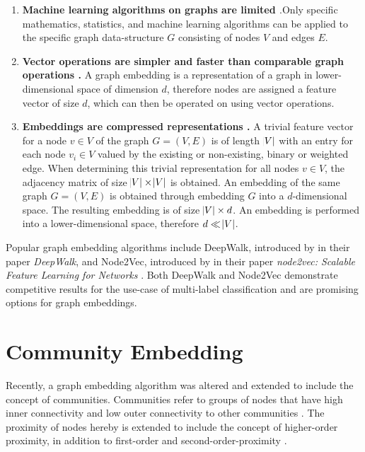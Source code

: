 \documentclass[conference]{IEEEtran}
\begin{document}
\begin{enumerate}
    \item \textbf{Machine learning algorithms on graphs are limited \cite{Godec2018}}.Only specific mathematics, statistics, and machine learning algorithms can be applied to the specific graph data-structure $G$ consisting of nodes $V$ and edges $E$.
    \item \textbf{Vector operations are simpler and faster than comparable graph operations \cite{Godec2018}.} A graph embedding is a representation of a graph in lower-dimensional space of dimension $d$, therefore nodes are assigned a feature vector of size $d$, which can then be operated on using vector operations.
    \item \textbf{Embeddings are compressed representations \cite{Godec2018}.} A trivial feature vector for a node $v \in V$ of the graph $G = (V, E)$ is of length $\abs{V}$ with an entry for each node $v_i \in V$ valued by the existing or non-existing, binary or weighted edge. When determining this trivial representation for all nodes $v \in V$, the adjacency matrix of size $\abs{V} \times \abs{V}$ is obtained. An embedding of the same graph $G = (V, E)$ is obtained through embedding $G$ into a $d$-dimensional space. The resulting embedding is of size $\abs{V} \times d$. An embedding is performed into a lower-dimensional space, therefore $d \ll \abs{V}$.
\end{enumerate}

Popular graph embedding algorithms include DeepWalk, introduced by \citeauthor{Perozzi2014DeepWalkOL} in their \citeyear{Perozzi2014DeepWalkOL} paper \textit{DeepWalk}, and Node2Vec, introduced by \citeauthor{Grover2016node2vecSF} in their \citeyear{Grover2016node2vecSF} paper \textit{node2vec: Scalable Feature Learning for Networks} \cite{Perozzi2014DeepWalkOL, Grover2016node2vecSF}. Both DeepWalk and Node2Vec demonstrate competitive results for the use-case of multi-label classification and are promising options for graph embeddings.

\section{Community Embedding}

Recently, a graph embedding algorithm was altered and extended to include the concept of communities. Communities refer to groups of nodes that have high inner connectivity and low outer connectivity to other communities \cite{ComE}. The proximity of nodes hereby is extended to include the concept of higher-order proximity, in addition to first-order and second-order-proximity \cite{ComE}.
\end{document}
